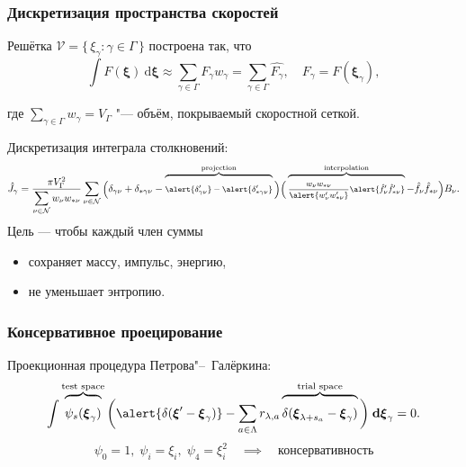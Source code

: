\documentclass[mathserif]{beamer} %
\newcommand{\dd}{\:\mathrm{d}}
\newcommand{\dxi}{\boldsymbol{\dd\xi}}
\newcommand{\bxi}{\boldsymbol{\xi}}
\newcommand{\Nu}{\mathcal{N}}
\newcommand{\Set}[2]{\{\,{#1}:{#2}\,\}}
\newcommand{\xoverbrace}[2][\vphantom{\int}]{\overbrace{#1#2}}
\begin{document}
\begin{frame}
    \frametitle{Дискретизация пространства скоростей}
    Решётка \(\mathcal{V} = \Set{\xi_\gamma}{\gamma\in\Gamma}\) построена так, что
    \begin{equation}\label{eq:xi_cubature}
        \int F(\bxi) \dxi \approx \sum_{\gamma\in\Gamma} F_\gamma w_\gamma =
            \sum_{\gamma\in\Gamma} \hat{F_\gamma},
            \quad F_\gamma = F(\bxi_\gamma),
    \end{equation}\vspace{-10pt}

    где \(\sum_{\gamma\in\Gamma} w_\gamma = V_\Gamma\) "--- объём, покрываемый скоростной сеткой.
    \pause\vspace{10pt}

    Дискретизация интеграла столкновений:
    \begin{equation}\label{eq:discrete_symm_ci}
        \footnotesize
        \hat{J}_\gamma = \frac{\pi V_\Gamma^2}{\displaystyle\sum_{\nu\in\Nu} w_{\nu}w_{*\nu}}
            \sum_{\nu\in\Nu} \bigg(
                \delta_{\gamma\nu} + \delta_{*\gamma\nu} -
                \xoverbrace{ \alert{\delta'_{\gamma\nu}} - \alert{\delta'_{*\gamma\nu}} }^\text{projection}
            \bigg)\bigg(
                \xoverbrace{ \frac{w_{\nu}w_{*\nu}}{\alert{w'_{\nu}w'_{*\nu}}}
                \alert{\hat{f}'_{\nu}\hat{f}'_{*\nu}} }^\text{interpolation} - \hat{f}_{\nu}\hat{f}_{*\nu}
            \bigg)B_\nu.
    \end{equation}\vspace{-10pt}
    Цель --- чтобы каждый член суммы\vspace{5pt}
    \begin{itemize}
        \item сохраняет массу, импульс, энергию,
        \item не уменьшает энтропию.
    \end{itemize}
\end{frame}

\begin{frame}
    \frametitle{Консервативное проецирование}
    \vspace{10pt}

    Проекционная процедура Петрова"--~Галёркина:
    \begin{equation}\label{eq:Petrov-Galerkin}
        \int \xoverbrace{ \psi_s(\bxi_\gamma) }^\text{test space} \bigg(
            \alert{\delta(\bxi'-\bxi_\gamma)} - \sum_{a\in\Lambda} r_{\lambda,a}
            \xoverbrace{ \delta(\bxi_{\lambda+s_a}-\bxi_\gamma) }^\text{trial space}
        \bigg) \dxi_\gamma = 0.
    \end{equation}
    \begin{equation*}
        \psi_0 = 1,\;\psi_i = \xi_i,\;\psi_4 = \xi_i^2
        \quad\implies\quad\text{консервативность}
    \end{equation*}
\end{frame}
\end{document}
